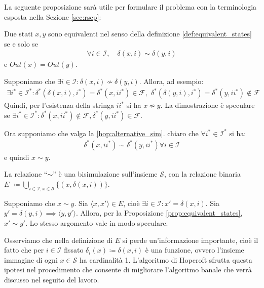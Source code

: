 La seguente proposizione sarà utile per formulare il problema con la terminologia esposta nella Sezione \ref{sec:rscp}:
\begin{proposition}
    \label{prop:equivalent_states}
    Due stati $x,y$ sono equivalenti nel senso della definizione \ref{def:equivalent_states} se e solo se
    \begin{gather}\label{hop:alternative_sim}
        \forall i \in \mathcal{I}, \quad \delta(x,i) \sim \delta(y,i)
    \end{gather}
    e $Out(x) = Out(y)$.
\end{proposition}
\begin{proof2}
    Supponiamo che $\exists i \in \mathcal{I} : \delta(x,i) \not\sim \delta(y,i)$. Allora, ad esempio:
    \begin{gather*}
        \exists i^* \in \mathcal{I}^* : \delta^*(\delta(x,i),i^*) = \delta^*(x,ii^*) \in \mathcal{F}, \,\, \delta^*(\delta(y,i),i^*) = \delta^*(y,ii^*) \notin \mathcal{F}
    \end{gather*}
    Quindi, per l'esistenza della stringa $ii^*$ si ha $x \not\sim y$. La dimostrazione è speculare se $\exists i^* \in \mathcal{I}^* : \delta^*(x,ii^*) \notin \mathcal{F}, \delta^*(y,ii^*) \in \mathcal{F}$.

    Ora supponiamo che valga la \ref{hop:alternative_sim}. \accente chiaro che $\forall i^* \in \mathcal{I}^*$ si ha:
    \begin{gather*}
        \delta^*(x,ii^*) \sim \delta^*(y,ii^*) \forall i \in \mathcal{I}
    \end{gather*}
    e quindi $x \sim y$.
\end{proof2}

\begin{proposition}
    La relazione ``$\sim$'' è una bisimulazione sull'insieme $\mathcal{S}$, con la relazione binaria $\displaystyle E \,\,\coloneqq \bigcup_{i \in \mathcal{I}, x \in \mathcal{S}} \{(x,\delta(x,i))\}$.
\end{proposition}
\begin{proof2}
    Supponiamo che $x \sim y$. Sia $\langle x, x'\rangle \in E$, cioè $\exists i \in \mathcal{I} : x' = \delta(x,i)$. Sia $y' = \delta(y,i) \implies \langle y, y'\rangle$. Allora, per la Proposizione \ref{prop:equivalent_states}, $x' \sim y'$. Lo stesso argomento vale in modo speculare.
\end{proof2}

Osserviamo che nella definizione di $E$ si perde un'informazione importante, cioè il fatto che per $i \in \mathcal{I}$ fissato $\delta_i(x) \coloneqq \delta(x,i)$ è una funzione, ovvero l'insieme immagine di ogni $x \in \mathcal{S}$ ha cardinalità 1. L'algoritmo di Hopcroft sfrutta questa ipotesi nel procedimento che consente di migliorare l'algoritmo banale che verrà discusso nel seguito del lavoro.

